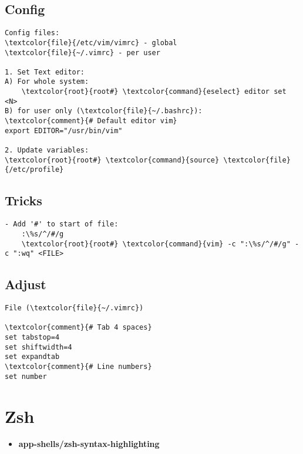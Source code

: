 \documentclass[10pt, a4paper, onecolumn, openany]{book}         %
\begin{document}
\subsection{Config}
\begin{Verbatim}[commandchars=\\\{\}]
Config files:
\textcolor{file}{/etc/vim/vimrc} - global
\textcolor{file}{~/.vimrc} - per user

1. Set Text editor:
A) For whole system:
    \textcolor{root}{root#} \textcolor{command}{eselect} editor set <N>
B) for user only (\textcolor{file}{~/.bashrc}):
\textcolor{comment}{# Default editor vim}
export EDITOR="/usr/bin/vim"

2. Update variables:
\textcolor{root}{root#} \textcolor{command}{source} \textcolor{file}{/etc/profile}
\end{Verbatim}
\subsection{Tricks}
\begin{Verbatim}[commandchars=\\\{\}]
- Add '#' to start of file:
    :\%s/^/#/g
    \textcolor{root}{root#} \textcolor{command}{vim} -c ":\%s/^/#/g" -c ":wq" <FILE>
\end{Verbatim}

\subsection{Adjust}
\begin{Verbatim}[commandchars=\\\{\}]
File (\textcolor{file}{~/.vimrc})

\textcolor{comment}{# Tab 4 spaces}
set tabstop=4
set shiftwidth=4
set expandtab
\textcolor{comment}{# Line numbers}
set number
\end{Verbatim}




\section{Zsh}
\begin{itemize}
    \item \textbf{app-shells/zsh-syntax-highlighting}
\end{itemize}
\end{document}
